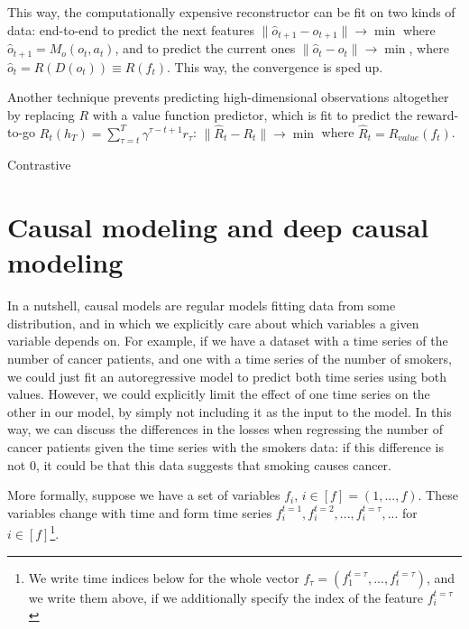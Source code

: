 \documentclass[a4paper,11pt,oneside]{report}
\begin{document}
This way, the computationally expensive reconstructor can be fit on two kinds of data: end-to-end to predict the next features $\|\hat{o}_{t+1}-o_{t+1}\|\to\min$ where $\hat{o}_{t+1}=M_o(o_t, a_t)$, and to predict the current ones $\|\hat{o}_t-o_t\|\to\min$, where $\hat{o}_t=R(D(o_t))\equiv R(f_t)$. This way, the convergence is sped up.

Another technique prevents predicting high-dimensional observations altogether by replacing $R$ with a value function predictor, which is fit to predict the reward-to-go $R_t(h_T)=\sum\limits_{\tau=t}^{T}\gamma^{\tau-t+1}r_{\tau}$:
$\|\hat{R}_t-R_t\|\to\min$ where $\hat{R}_t=R_{value}(f_t)$.

Contrastive \cite{VanDenOord2018}


\section{Causal modeling and deep causal modeling}
\label{sec:causal}
In a nutshell, causal models are regular models fitting data from some distribution, and in which we explicitly care about which variables a given variable depends on. For example, if we have a dataset with a time series of the number of cancer patients, and one with a time series of the number of smokers, we could just fit an autoregressive model to predict both time series using both values. However, we could explicitly limit the effect of one time series on the other in our model, by simply not including it as the input to the model. In this way, we can discuss the differences in the losses when regressing the number of cancer patients given the time series with the smokers data: if this difference is not 0, it could be that this data suggests that smoking causes cancer.

More formally, suppose we have a set of variables $f_i$, $i\in[f]=(1, ..., f)$. These variables change with time and form time series $f_i^{t=1},f_i^{t=2},...,f_i^{t=\tau},...$ for $i\in[f]$\footnote{We write time indices below for the whole vector $f_{\tau}=(f_1^{t=\tau},...,f_t^{t=\tau})$, and we write them above, if we additionally specify the index of the feature $f_i^{t=\tau}$}.
\end{document}
